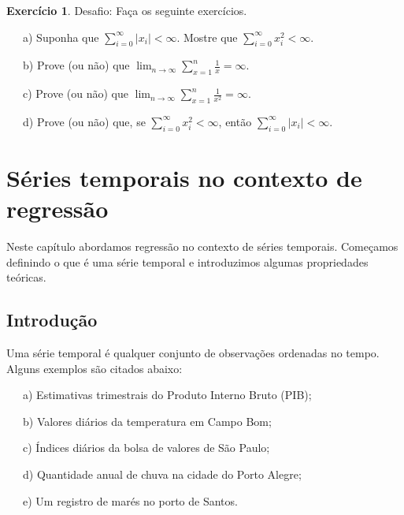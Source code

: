 \documentclass[
]{book}
\theoremstyle{definition}
\theoremstyle{definition}
\theoremstyle{definition}
\newtheorem{exercise}{Exercício}[chapter]
\theoremstyle{remark}
\begin{document}
\begin{exercise}
\protect\hypertarget{exr:exerint8}{}{\label{exr:exerint8} }Desafio: Faça os seguinte exercícios.

~~~a) Suponha que \(\sum_{i=0}^{\infty}|x_i|<\infty\). Mostre que \(\sum_{i=0}^{\infty}x_i^{2}<\infty\).

~~~b) Prove (ou não) que \(\lim_{n\rightarrow\infty}\sum_{x=1}^{n}\frac{1}{x}=\infty\).

~~~c) Prove (ou não) que \(\lim_{n\rightarrow\infty}\sum_{x=1}^{n}\frac{1}{x^2}=\infty\).

~~~d) Prove (ou não) que, se \(\sum_{i=0}^{\infty}x_i^2<\infty\), então \(\sum_{i=0}^{\infty}|x_i|<\infty\).
\end{exercise}

\hypertarget{streg}{%
\chapter{Séries temporais no contexto de regressão}\label{streg}}

Neste capítulo abordamos regressão no contexto de séries temporais. Começamos
definindo o que é uma série temporal e introduzimos algumas propriedades teóricas.

\hypertarget{introduuxe7uxe3o}{%
\section{Introdução}\label{introduuxe7uxe3o}}

Uma série temporal é qualquer conjunto de observações ordenadas no tempo. Alguns
exemplos são citados abaixo:

~~~a) Estimativas trimestrais do Produto Interno Bruto (PIB);

~~~b) Valores diários da temperatura em Campo Bom;

~~~c) Índices diários da bolsa de valores de São Paulo;

~~~d) Quantidade anual de chuva na cidade do Porto Alegre;

~~~e) Um registro de marés no porto de Santos.
\end{document}
